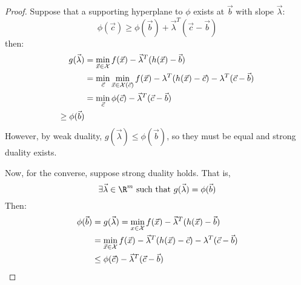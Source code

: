 \documentclass[../Main.tex]{subfiles}
\begin{document}
\begin{proof}
    Suppose that a supporting hyperplane to $\phi$ exists at $\vec{b}$ with slope $\vec{\lambda}$:
    \begin{equation*}
        \phi(\vec{c}) \geq \phi(\vec{b}) + \vec{\lambda}^T (\vec{c} - \vec{b})
    \end{equation*}
    then:
    \begin{align*}
        g(\vec{\lambda}) &= \min_{\vec{x} \in \mathcal{X}} f(\vec{x}) - \vec{\lambda}^T (h(\vec{x}) - \vec{b}) \\
        &= \min_{\vec{c}} \min_{\vec{x} \in \mathcal{X}(\vec{c})} f(\vec{x}) - \lambda^T (h(\vec{x}) - \vec{c}) - \lambda^T (\vec{c} - \vec{b}) \\
        &= \min_{\vec{c}} \phi(\vec{c}) - \vec{\lambda}^T (\vec{c} - \vec{b}) \\
        \geq \phi(\vec{b})
    \end{align*}
    However, by weak duality, $g(\vec{\lambda}) \leq \phi(\vec{b})$, so they must be equal and strong duality exists.

    Now, for the converse, suppose strong duality holds. That is,
    \begin{equation*}
        \exists \vec{\lambda} \in \R^m \text{ such that } g(\vec{\lambda}) = \phi(\vec{b})
    \end{equation*}
    Then:
    \begin{align*}
        \phi(\vec{b}) &= g(\vec{\lambda}) = \min_{x \in \mathcal{X}} f(\vec{x}) - \vec{\lambda}^T (h(\vec{x}) - \vec{b}) \\
        &= \min_{\vec{x} \in \mathcal{X}} f(\vec{x}) - \vec{\lambda}^T (h(\vec{x}) - \vec{c}) - \lambda^T (\vec{c} - \vec{b}) \\
        &\leq \phi(\vec{c}) - \vec{\lambda}^T (\vec{c} - \vec{b})
    \end{align*}
\end{proof}
\end{document}

